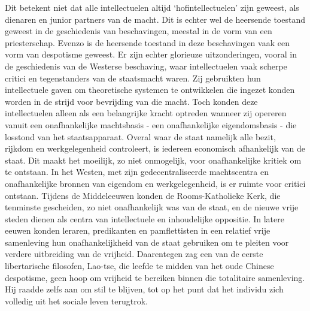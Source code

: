 \documentclass[
  a5paper,
  smalldemyvopaper,10pt,twoside,onecolumn,openright,extrafontsizes,hidelinks]{memoir}
\begin{document}
Dit betekent niet dat alle intellectuelen altijd `hofintellectuelen'
zijn geweest, als dienaren en junior partners van de macht. Dit is
echter wel de heersende toestand geweest in de geschiedenis van
beschavingen, meestal in de vorm van een priesterschap. Evenzo is de
heersende toestand in deze beschavingen vaak een vorm van despotisme
geweest. Er zijn echter glorieuze uitzonderingen, vooral in de
geschiedenis van de Westerse beschaving, waar intellectuelen vaak
scherpe critici en tegenstanders van de staatsmacht waren. Zij
gebruikten hun intellectuele gaven om theoretische systemen te
ontwikkelen die ingezet konden worden in de strijd voor bevrijding van
die macht. Toch konden deze intellectuelen alleen als een belangrijke
kracht optreden wanneer zij opereren vanuit een onafhankelijke
machtsbasis - een onafhankelijke eigendomsbasis - die losstond van het
staatsapparaat. Overal waar de staat namelijk alle bezit, rijkdom en
werkgelegenheid controleert, is iedereen economisch afhankelijk van de
staat. Dit maakt het moeilijk, zo niet onmogelijk, voor onafhankelijke
kritiek om te ontstaan. In het Westen, met zijn gedecentraliseerde
machtscentra en onafhankelijke bronnen van eigendom en werkgelegenheid,
is er ruimte voor critici ontstaan. Tijdens de Middeleeuwen konden de
Rooms-Katholieke Kerk, die tenminste gescheiden, zo niet onafhankelijk
was van de staat, en de nieuwe vrije steden dienen als centra van
intellectuele en inhoudelijke oppositie. In latere eeuwen konden
leraren, predikanten en pamflettisten in een relatief vrije samenleving
hun onafhankelijkheid van de staat gebruiken om te pleiten voor verdere
uitbreiding van de vrijheid. Daarentegen zag een van de eerste
libertarische filosofen, Lao-tse, die leefde te midden van het oude
Chinese despotisme, geen hoop om vrijheid te bereiken binnen die
totalitaire samenleving. Hij raadde zelfs aan om stil te blijven, tot op
het punt dat het individu zich volledig uit het sociale leven terugtrok.
\end{document}
